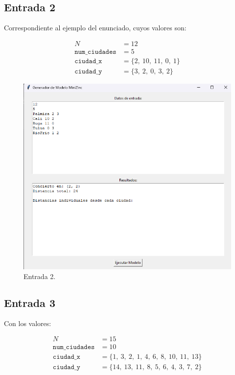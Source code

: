 \documentclass[conference]{IEEEtran}
\begin{document}
\subsection{Entrada 2}

Correspondiente al ejemplo del enunciado, cuyos valores son:

\begin{align*}
	N &= 12 \\
	\texttt{num\_ciudades} &= 5 \\
	\texttt{ciudad\_x} &= \{2,\ 10,\ 11,\ 0,\ 1\} \\
	\texttt{ciudad\_y} &= \{3,\ 2,\ 0,\ 3,\ 2\}
\end{align*}

\begin{figure}[h]
	\centering
	\includegraphics[width=1.0\linewidth]{images/entrada2}
	\caption{Entrada 2.}
	\label{fig:entrada2}
\end{figure}

\subsection{Entrada 3}

Con los valores:

\begin{align*}
	N &= 15 \\
	\texttt{num\_ciudades} &= 10 \\
	\texttt{ciudad\_x} &= \{1,\ 3,\ 2,\ 1,\ 4,\ 6,\ 8,\ 10,\ 11,\ 13\} \\
	\texttt{ciudad\_y} &= \{14,\ 13,\ 11,\ 8,\ 5,\ 6,\ 4,\ 3,\ 7,\ 2\}
\end{align*}
\end{document}

